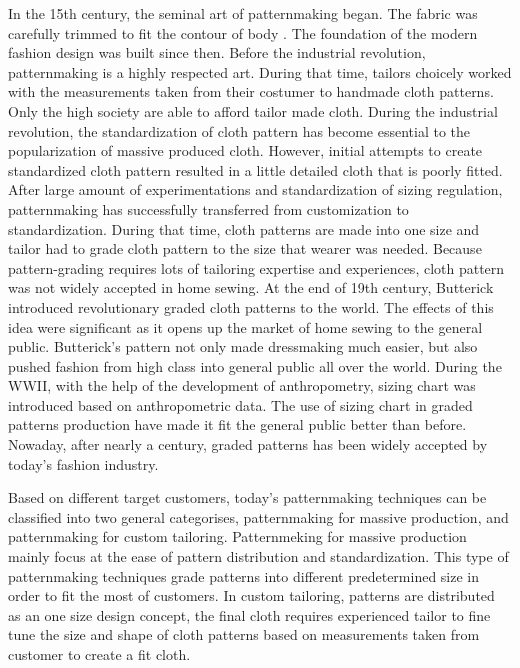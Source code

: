 In the 15th century, the seminal art of patternmaking began. The fabric was carefully trimmed to fit the contour of body . The foundation of the modern fashion design was built since then. Before the industrial revolution, patternmaking is a highly respected art. During that time, tailors choicely worked with the measurements taken from their costumer to handmade cloth patterns. Only the high society are able to afford tailor made cloth. During the industrial revolution, the standardization of cloth pattern has become essential to the popularization of massive produced cloth. However, initial attempts to create standardized cloth pattern resulted in a little detailed cloth that is poorly fitted. After large amount of experimentations and standardization of sizing regulation, patternmaking has successfully transferred from customization to standardization. During that time, cloth patterns are made into one size and tailor had to grade cloth pattern to the size that wearer was needed. Because pattern-grading requires lots of tailoring expertise and experiences, cloth pattern was not widely accepted in home sewing. At the end of 19th century, Butterick introduced revolutionary graded cloth patterns to the world. The effects of this idea were significant as it opens up the market of home sewing to the general public. Butterick's pattern not only made dressmaking much easier, but also pushed fashion from high class into general public all over the world. During the WWII,  with the help of the development of anthropometry, sizing chart was introduced based on anthropometric data. The use of sizing chart in graded patterns production have made it fit the general public better than before. Nowaday, after nearly a century, graded patterns has been widely accepted by today's fashion industry. 

Based on different target customers, today's patternmaking techniques can be classified into two general categorises, patternmaking for massive production, and patternmaking for custom tailoring. Patternmeking for massive production mainly focus at the ease of pattern distribution and standardization. This type of patternmaking techniques grade patterns into different predetermined size in order to fit the most of customers. In custom tailoring, patterns are distributed as an one size design concept, the final cloth requires experienced tailor to fine tune the size and shape of cloth patterns based on measurements taken from customer to create a fit cloth. 

